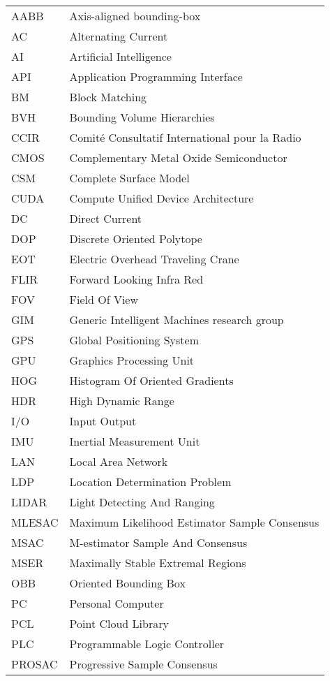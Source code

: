 \documentclass[12pt,a4paper,oneside,pdftex]{report}
\begin{document}
\noindent
\begin{longtable}{@{}p{}p{}@{}}
AABB & Axis-aligned bounding-box \\
AC & Alternating Current \\
AI & Artificial Intelligence \\
API & Application Programming Interface \\
BM & Block Matching \\
BVH & Bounding Volume Hierarchies \\
CCIR & Comité Consultatif International pour la Radio \\
CMOS & Complementary Metal Oxide Semiconductor \\
CSM & Complete Surface Model \\
CUDA & Compute Unified Device Architecture \\
DC & Direct Current \\
DOP & Discrete Oriented Polytope \\
EOT & Electric Overhead Traveling Crane \\
FLIR & Forward Looking Infra Red \\
FOV & Field Of View \\
GIM & Generic Intelligent Machines research group \\
GPS & Global Positioning System \\
GPU & Graphics Processing Unit \\
HOG & Histogram Of Oriented Gradients \\
HDR & High Dynamic Range \\
I/O & Input Output\\
IMU & Inertial Measurement Unit \\
LAN & Local Area Network \\
LDP & Location Determination Problem \\
LIDAR & Light Detecting And Ranging \\
MLESAC & Maximum Likelihood Estimator Sample Consensus \\
MSAC & M-estimator Sample And Consensus \\
MSER & Maximally Stable Extremal Regions \\ 
OBB & Oriented Bounding Box \\
PC & Personal Computer \\
PCL & Point Cloud Library \\
PLC & Programmable Logic Controller \\
PROSAC & Progressive Sample Consensus \\

\end{longtable}
\end{document}
